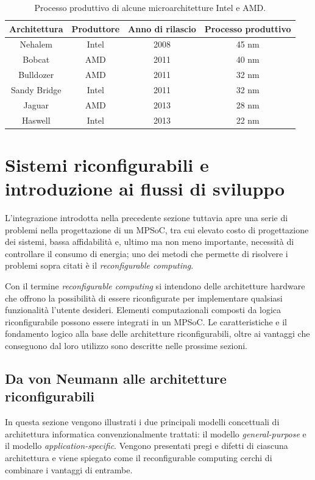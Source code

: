 \begin{table}[t]
  \begin{center}
    \begin{tabular}{|c|c|c|c|}
      \hline
      \textbf{Architettura} & \textbf{Produttore} & \textbf{Anno di rilascio} & \textbf{Processo produttivo}\\
      \hline
      Nehalem & Intel & 2008 & 45 nm\\
      \hline
      Bobcat & AMD & 2011 & 40 nm\\
      \hline
      Bulldozer & AMD & 2011 & 32 nm\\
      \hline
      Sandy Bridge & Intel & 2011 & 32 nm\\
      \hline
      Jaguar & AMD & 2013 & 28 nm\\
      \hline
      Haswell & Intel & 2013 & 22 nm\\
      \hline
    \end{tabular}
    \caption{Processo produttivo di alcune microarchitetture Intel
      \cite{IntelTransistor, IntelsVision} e AMD.}
    \label{tab:processoProduttivo}
  \end{center}
\end{table}



\section{Sistemi riconfigurabili e introduzione ai flussi di sviluppo}
\label{sec:reconfComp}
L'integrazione introdotta nella precedente sezione tuttavia apre una serie di problemi nella progettazione
di un \ac{MPSoC}, tra cui elevato costo di progettazione dei sistemi, bassa affidabilità e, ultimo
ma non meno importante, necessità di controllare il consumo di energia; uno dei metodi che 
permette di risolvere i problemi sopra citati  \`e il \emph{reconfigurable computing}.

Con il termine \emph{reconfigurable computing} si intendono delle architetture hardware che 
offrono la possibilità di essere riconfigurate per implementare qualsiasi funzionalità 
l'utente desideri. Elementi computazionali composti da logica riconfigurabile possono essere integrati in un
\ac{MPSoC}. Le caratteristiche e il fondamento logico alla base delle architetture riconfigurabili,
oltre ai vantaggi che conseguono dal loro utilizzo sono descritte nelle prossime sezioni.

\subsection{Da von Neumann alle architetture riconfigurabili}
\label{subsec:cambioParadigma}
In questa sezione vengono illustrati i due principali modelli concettuali di architettura
informatica convenzionalmente trattati: il modello \emph{general-purpose} e il modello
\emph{application-specific}. Vengono presentati pregi e difetti di ciascuna architettura
e viene spiegato come il reconfigurable computing cerchi di combinare i vantaggi di
entrambe.

